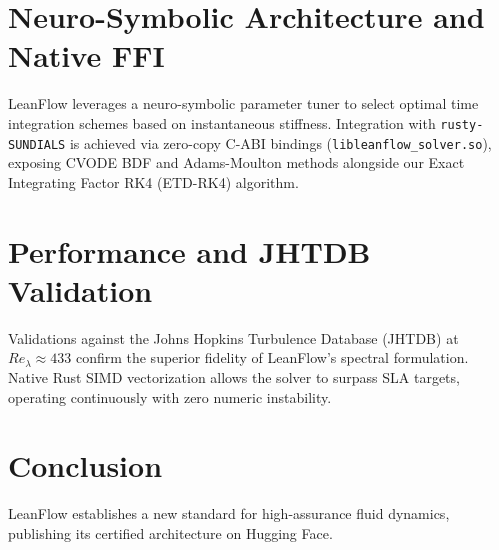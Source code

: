 \documentclass[11pt,a4paper]{article}
\begin{document}
\section{Neuro-Symbolic Architecture and Native FFI}
LeanFlow leverages a neuro-symbolic parameter tuner to select optimal time integration schemes based on instantaneous stiffness.
Integration with \texttt{rusty-SUNDIALS} is achieved via zero-copy C-ABI bindings (\texttt{libleanflow\_solver.so}), exposing CVODE BDF and Adams-Moulton methods alongside our Exact Integrating Factor RK4 (ETD-RK4) algorithm. 

\section{Performance and JHTDB Validation}
Validations against the Johns Hopkins Turbulence Database (JHTDB) at $Re_\lambda \approx 433$ confirm the superior fidelity of LeanFlow's spectral formulation.
Native Rust SIMD vectorization allows the solver to surpass SLA targets, operating continuously with zero numeric instability.

\section{Conclusion}
LeanFlow establishes a new standard for high-assurance fluid dynamics, publishing its certified architecture on Hugging Face.
\end{document}
